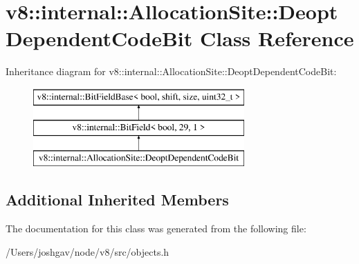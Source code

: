 \hypertarget{classv8_1_1internal_1_1_allocation_site_1_1_deopt_dependent_code_bit}{}\section{v8\+:\+:internal\+:\+:Allocation\+Site\+:\+:Deopt\+Dependent\+Code\+Bit Class Reference}
\label{classv8_1_1internal_1_1_allocation_site_1_1_deopt_dependent_code_bit}
Inheritance diagram for v8\+:\+:internal\+:\+:Allocation\+Site\+:\+:Deopt\+Dependent\+Code\+Bit\+:\begin{figure}[H]
\begin{center}
\leavevmode
\includegraphics[height=3.000000cm]{classv8_1_1internal_1_1_allocation_site_1_1_deopt_dependent_code_bit}
\end{center}
\end{figure}
\subsection*{Additional Inherited Members}


The documentation for this class was generated from the following file\+:\begin{DoxyCompactItemize}
\item 
/\+Users/joshgav/node/v8/src/objects.\+h\end{DoxyCompactItemize}
